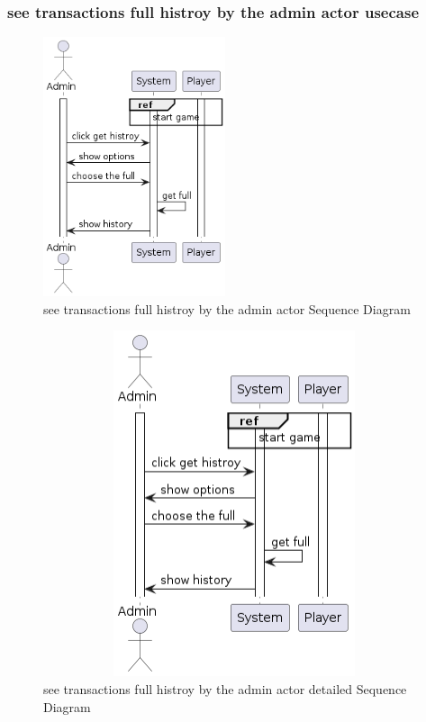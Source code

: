 \documentclass{article}
\begin{document}
\subsubsection{see transactions full histroy by the admin actor usecase}
 \begin{figure}[H]
	 \centering
	 \includegraphics[height=3in]{../thesis_tex/assets/diagrams/see_transactions_full_history_SD.png}
	 \caption{see transactions full histroy by the admin actor Sequence Diagram}
\end{figure}

 \begin{figure}[H]
	 \centering
	 \includegraphics[height=4in,width=6in]{../thesis_tex/assets/diagrams/see_transactions_full_history_detailedSD.png}
	 \caption{see transactions full histroy by the admin actor detailed Sequence Diagram}
\end{figure}
\end{document}
